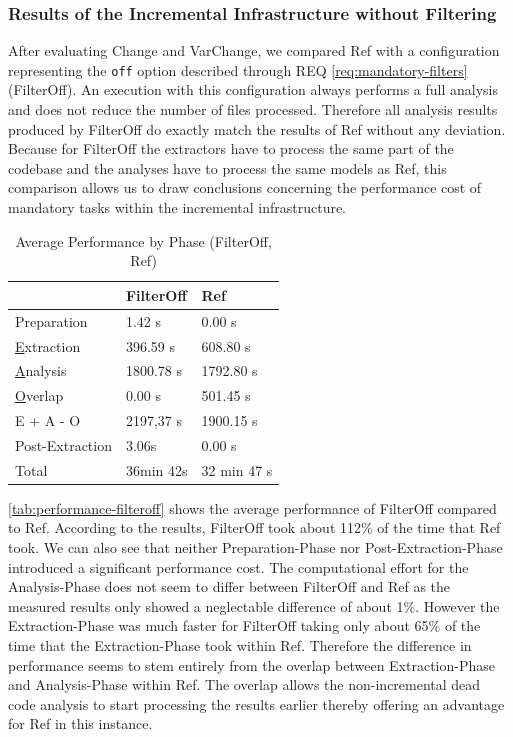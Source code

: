 \documentclass[a4paper]{article}
\begin{document}
 \clearpage
 \newpage
\subsubsection{Results of the Incremental Infrastructure without Filtering}\label{evaluation-filteroff}

After evaluating Change and VarChange, we compared Ref with a configuration representing the \texttt{off} option described through REQ \ref{req:mandatory-filters} (FilterOff). An execution with this configuration always performs a full analysis and does not reduce the number of files processed. Therefore all analysis results produced by FilterOff do exactly match the results of Ref without any deviation. Because for FilterOff the extractors have to process the same part of the codebase and the analyses have to process the same models as Ref, this comparison allows us to draw conclusions concerning the performance cost of mandatory tasks within the incremental infrastructure.

\begin {table}[h]
\begin{center}
\caption {Average Performance by Phase (FilterOff, Ref)} \label{tab:performance-filteroff} 
\begin{tabular}{|l | l | l|}
\hline
                               & FilterOff                   & Ref  \\ \hline
	Preparation                & 1.42 s                      & 0.00 s \\
	\underline{E}xtraction     & 396.59 s                    & 608.80 s \\
	\underline{A}nalysis       & 1800.78 s                   & 1792.80 s \\
	\underline{O}verlap        & 0.00 s                      & 501.45 s \\
	E + A - O                  & 2197,37 s                   & 1900.15 s \\
	Post-Extraction            & 3.06s                       & 0.00 s \\ \hline
	Total                      & 36min 42s                   & 32 min 47 s \\ \hline
\end{tabular}
\end{center}
\end{table}

\autoref{tab:performance-filteroff} shows the average performance of FilterOff compared to Ref. According to the results, FilterOff took about 112\% of the time that Ref took. We can also see that neither Preparation-Phase nor Post-Extraction-Phase introduced a significant performance cost. The computational effort for the Analysis-Phase does not seem to differ between FilterOff and Ref as the measured results only showed a neglectable difference of about 1\%. However the Extraction-Phase was much faster for FilterOff taking only about 65\% of the time that the Extraction-Phase took within Ref. Therefore the difference in performance seems to stem entirely from the overlap between Extraction-Phase and Analysis-Phase within Ref. The overlap allows the non-incremental dead code analysis to start processing the results earlier thereby offering an advantage for Ref in this instance. 
\end{document}

